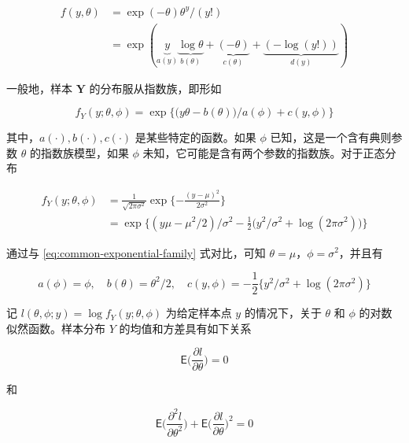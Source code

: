 \documentclass[12pt,a4paper,UTF8,twoside]{book}
\theoremstyle{definition}
\theoremstyle{definition}
\theoremstyle{definition}
\theoremstyle{remark}
\begin{document}
\begin{equation*}
\begin{split}
f(y,\theta) & = \exp(-\theta) \theta^y/(y!) \\
            & = \exp\left( \underbrace{y}_{a(y)} 
                           \underbrace{\log \theta}_{b(\theta)} + 
                           \underbrace{(-\theta)}_{c(\theta)} + 
                           \underbrace{(- \log(y!))}_{d(y)} \right)
\end{split} \label{eq:another-exp-fam}
\end{equation*}

一般地，样本 \(\mathbf{Y}\) 的分布服从指数族，即形如

\begin{equation}
f_{Y}(y;\theta,\phi) = \exp\big\{ \big(y\theta - b(\theta) \big)/a(\phi) + c(y,\phi) \big\}
\label{eq:common-exponential-family}
\end{equation}

其中，\(a(\cdot),b(\cdot),c(\cdot)\) 是某些特定的函数。如果 \(\phi\)
已知，这是一个含有典则参数 \(\theta\) 的指数族模型，如果 \(\phi\)
未知，它可能是含有两个参数的指数族。对于正态分布

\begin{equation}
\begin{aligned}
f_{Y}(y;\theta,\phi) & = \frac{1}{\sqrt{2\pi\sigma^2}} \exp\{-\frac{(y - \mu)^2}{2\sigma^2}  \}  \\
 & = \exp\big \{ (y\mu - \mu^2/2)/\sigma^2 - \frac{1}{2}\big(y^2/\sigma^2 + \log(2\pi\sigma^2)\big) \big\}
\end{aligned} \label{eq:normal-distribution}
\end{equation}

通过与 \eqref{eq:common-exponential-family} 式对比，可知
\(\theta = \mu\)，\(\phi = \sigma^2\)，并且有

\[
a(\phi) = \phi, \quad b(\theta) = \theta^2/2, \quad c(y,\phi) = - \frac{1}{2}\{ y^2/\sigma^2 + \log(2\pi\sigma^2) \} 
\]

记 \(l(\theta,\phi;y) = \log f_{Y}(y;\theta,\phi)\) 为给定样本点 \(y\)
的情况下，关于 \(\theta\) 和 \(\phi\) 的对数似然函数。样本分布 \(Y\)
的均值和方差具有如下关系

\begin{equation}
\mathsf{E}\big( \frac{\partial l}{\partial \theta} \big) = 0
\label{eq:mean-log-lik}
\end{equation}

和

\begin{equation}
\mathsf{E}\big( \frac{\partial^2 l}{\partial \theta^2} \big) + \mathsf{E}\big(\frac{\partial l}{\partial \theta}\big)^2  = 0
\label{eq:variance-log-lik}
\end{equation}
\end{document}
